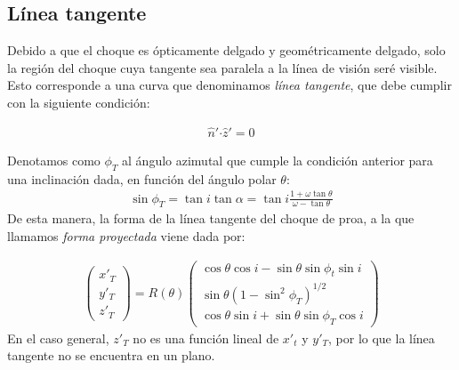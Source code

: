 \subsection{Línea tangente}
\label{sec:tangent-line}
Debido a que el choque es ópticamente delgado y geométricamente
delgado, solo la región del choque cuya tangente sea paralela a la
línea de visión seré visible. Esto corresponde a una curva que
denominamos \textit{línea tangente}, que debe cumplir con la siguiente
condición:

\begin{align}
  \hat{n}'\boldsymbol{\cdot} \hat{z}' = 0
\end{align}

Denotamos como $\phi_T$ al ángulo azimutal que cumple la condición anterior
para una inclinación dada, en función del ángulo polar $\theta$:
\begin{align}
  \sin\phi_T = \tan i\tan\alpha = \tan i\frac{1+\omega\tan\theta}{\omega-\tan\theta}
  \label{eq:phi-tan}
\end{align}
De esta manera, la forma de la línea tangente del choque de proa, a la que llamamos
\textit{forma proyectada} viene dada por:

\begin{align}
  \left(
  \begin{array}{c}
    x'_T \\
    y'_T \\
    z'_T
  \end{array}
  \right) =
  R(\theta)\left(
  \begin{array}{c}
    \cos\theta\cos i - \sin\theta\sin\phi_t\sin i \\
    \sin\theta\left(1-\sin^2\phi_T\right)^{1/2} \\
    \cos\theta\sin i + \sin\theta\sin\phi_T\cos i
  \end{array}
  \right) \label{eq:proj-shape}
\end{align}
En el caso general, $z'_T$ no es una función lineal de $x'_t$ y $y'_T$, por lo que
la línea tangente no se encuentra en un plano.

